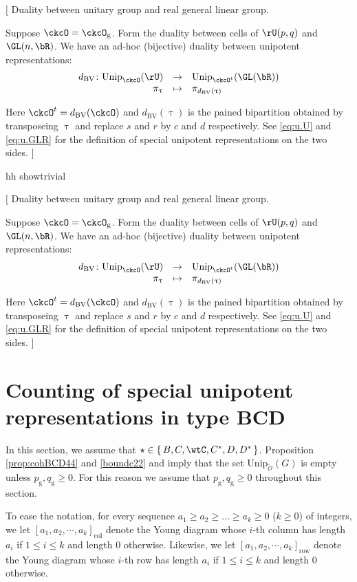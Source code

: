 \documentclass[12pt,a4paper]{amsart}
\newcommand{\trivial}[2][]{\if\relax\detokenize{#1}\relax
  {%
      \color{orange} \vspace{0em} $[$  #2 $]$
      \color{black}
  }
  \else
\ifx#1h
\ifcsname showtrivial\endcsname
{%
    \color{orange} \vspace{0em}  $[$ #2 $]$
    \color{black}
}
\fi
\else {\red Wrong argument!} \fi
\fi
}
\newcommand{\CO}{{\mathcal {O}}}
\numberwithin{equation}{section}
\theoremstyle{remark}
\newtheorem{remark}[thm]{Remark}
\def\Unip{\mathrm{Unip}}
\def\dBV{d_{\mathrm{BV}}}
\begin{document}
\trivial[h]{
  Duality between unitary group and real general linear group.

Suppose $\ckcO = \ckcO_{\mathrm g}$. Form the duality between cells of $\rU(p,q)$ and
$\GL(n,\bR)$. We have an ad-hoc (bijective) duality between unipotent
representations:
\[
  \begin{array}{rcl}
 \dBV\colon \Unip_{\ckcO}(\rU)& \rightarrow &\Unip_{\ckcO^t}(\GL(\bR)) \\
 \pi_\uptau &\mapsto& \pi_{\dBV(\uptau)} \\
  \end{array}
\]

Here $\ckcO^t = \dBV(\ckcO)$ and $\dBV(\uptau)$ is the pained bipartition
obtained by transposeing $\uptau$ and replace $s$ and $r$ by $c$ and $d$
respectively. See \eqref{eq:u.U} and \eqref{eq:u.GLR} for the definition of
special unipotent representations on the two sides.
}

%



% 

% 


\section{Counting of special unipotent representations in type BCD}



In this section, we assume that $\star \in \set{B,C,\wtC,C^{*},D,D^{*}}$. Proposition \ref{prop:cohBCD44} and \eqref{boundc22} and  imply that the set $\Unip_{\check \CO}(G)$ is empty unless
 $p_\mathrm g, q_\mathrm g\geq 0$. For this reason we assume that  $p_\mathrm g, q_\mathrm g\geq 0$ throughout this section. 
 
 

To ease the notation, for every sequence $a_1\geq a_2\geq \dots \geq a_k\geq 0$ ($k\geq 0$) of integers,   we let $[a_1, a_2, \cdots, a_k]_{\mathrm{col}}$ denote the Young diagram
whose $i$-th column has length $a_i$ if $1 \leq i \leq k$ and length $0$
otherwise. Likewise, we let $[a_1, a_2, \cdots, a_k]_{\mathrm{row}}$ denote the Young diagram
whose $i$-th  row has length $a_i$ if $1 \leq i \leq k$ and length $0$ otherwise.
\end{document}

